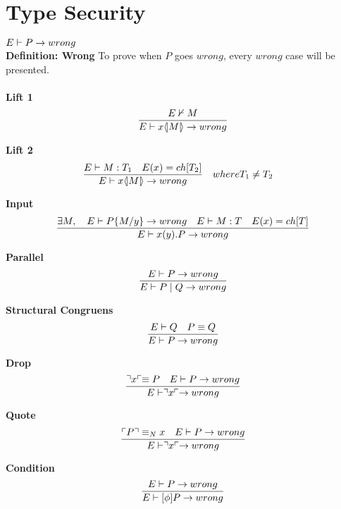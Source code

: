 \section{Type Security}
\begin{theorem}[Wrong]
    \ensuremath{E \vdash P \ra wrong} \\
    \textbf{Definition: Wrong}
    To prove when \ensuremath{P} goes \ensuremath{wrong}, every \ensuremath{wrong} case will be presented.\\\\
    \textbf{Lift 1} \begin{align*}
        \frac{E \nvdash M}{E \vdash x \langle \! | M | \! \rangle \rightarrow wrong}
    \end{align*}

    \textbf{Lift 2} \begin{align*}
        \frac{E \vdash M:T_1 \quad E(x)=ch[T_2]}{E \vdash x \langle \! | M | \! \rangle \rightarrow wrong} &\quad where T_1 \neq T_2
    \end{align*}

    \textbf{Input} \begin{align*}
        \frac{\exists M,\quad E \vdash P\{ M/ y\} \rightarrow wrong \quad E \vdash M:T \quad E(x)= ch[T]} {E \vdash x(y).P \rightarrow wrong}\\
    \end{align*}

    \textbf{Parallel} \begin{align*}
        \frac{E \vdash P \rightarrow wrong}{E \vdash P \mid Q \rightarrow wrong}
    \end{align*}

    \textbf{Structural Congruens} \begin{align*}
        \frac{E \vdash Q \quad P \equiv Q}{E \vdash P \rightarrow wrong}
    \end{align*}

    \textbf{Drop}\begin{align*}
        \frac{\urcorner x \ulcorner \equiv P \quad E \vdash P \rightarrow wrong}{E \vdash \urcorner x \ulcorner \rightarrow wrong}
    \end{align*}

    \textbf{Quote}\begin{align*}
        \frac{\ulcorner P \urcorner \equiv _N x \quad E \vdash P \rightarrow wrong}{E \vdash \urcorner x \ulcorner \rightarrow wrong}
    \end{align*}

    \textbf{Condition}\begin{align*}
        \frac{E \vdash P \rightarrow wrong}{E \vdash [\phi]P \rightarrow wrong}
    \end{align*}
\end{theorem}

